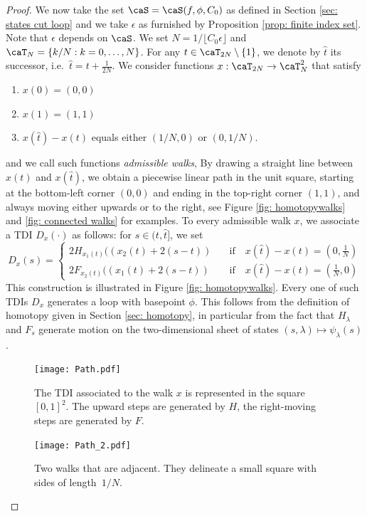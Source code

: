 \begin{proof}
	We now take the set $\caS=\caS(f,\phi,C_0)$ as defined in Section \ref{sec: states cut loop} and we take $\epsilon$ as furnished by Proposition \ref{prop: finite index set}. Note that $\epsilon$ depends on $\caS$.
	We set $N=1/\lfloor C_0\epsilon\rfloor$ and $\caT_N=\{k/N:k=0,\ldots,N\}$. For any $t\in\caT_{2N} \setminus \{1\}$, we denote by $\hat{t}$ its successor, i.e.\ $\hat{t}=t+\tfrac{1}{2N}$.
	We consider functions $x: \caT_{2N} \to \caT_{N}^2 $ that satisfy
	\begin{enumerate}
		\item $x(0)=(0,0)$
		\item $x(1)=(1,1)$
		\item $x(\hat{t})-x(t)$ equals either $(1/N,0)$ or $(0,1/N)$.
	\end{enumerate}  
	and we call such functions \emph{admissible walks}, 
	By drawing a straight line between $x(t)$ and $x(\hat{t})$, we obtain a piecewise linear path in the unit square, starting at the bottom-left corner $(0,0)$ and ending in the top-right corner $(1,1)$, and always moving either upwards or to the right, see Figure \ref{fig: homotopywalks} and  \ref{fig: connected walks} for examples.
	To every admissible walk $x$, we associate a TDI $D_x(\cdot)$ as follows: for $s\in (t,\hat{t}]$, we set 
	\begin{equation}
		D_x(s)= 
		\begin{cases}
			2H_{x_1(t)} ((x_2(t)+2(s-t)) &  \quad \text{if} \quad   x(\hat{t})-x(t)= (0,\tfrac{1}{N})   \\[1mm]
			2F_{x_2(t)} ((x_1(t)+2(s-t)) &  \quad \text{if} \quad  x(\hat{t})-x(t)= (\tfrac{1}{N},0)   
		\end{cases}
	\end{equation}
	This construction is illustrated in Figure \ref{fig: homotopywalks}. Every one of such TDIs $D_x$ generates a loop with basepoint $\phi$. This follows from the definition of homotopy given in Section \ref{sec: homotopy}, in particular from the fact that $H_\lambda$ and $F_s$ generate motion on the two-dimensional sheet of states $(s,\lambda)\mapsto\psi_\lambda(s)$.
	
	\begin{figure}
		\centering
		\begin{minipage}{0.475\textwidth}
			\centering
			\texttt{[image: Path.pdf]}
			\caption{The TDI associated to the walk $x$ is represented in the square $[0,1]^2$. The upward steps are generated by $H$, the right-moving steps are generated by $F$.}
			\label{fig: homotopywalks}
		\end{minipage}\hfill
		\begin{minipage}{0.475\textwidth}
			\centering
			\texttt{[image: Path\_2.pdf]}
			\caption{Two walks that are adjacent. They delineate a small square with sides of length~$1/N$.  }
			\label{fig: adjacentpaths}
		\end{minipage}
	\end{figure}
	

\end{proof}
